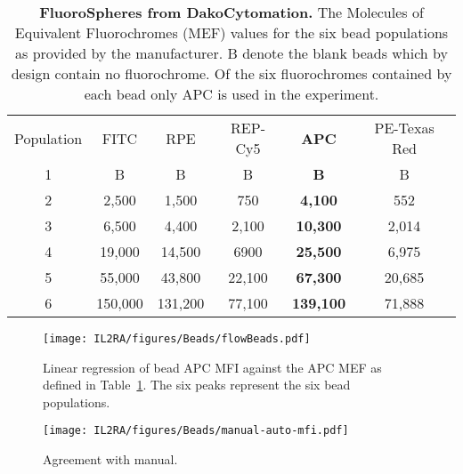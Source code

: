 \clearpage

\begin{table} [hb]
\begin{center}
\begin{tabular} {|c c c c c c|}
\cline{1-6}
Population  & FITC    & RPE     & REP-Cy5 & \textbf{APC}     & PE-Texas Red\\
\cline{1-6}
1           & B       & B       & B       & \textbf{B}       & B \\
2           & 2,500   & 1,500   & 750     & \textbf{4,100}   & 552\\
3           & 6,500   & 4,400   & 2,100   & \textbf{10,300}  & 2,014\\
4           & 19,000  & 14,500  & 6900    & \textbf{25,500}  & 6,975\\
5           & 55,000  & 43,800  & 22,100  & \textbf{67,300}  & 20,685\\
6           & 150,000 & 131,200 & 77,100  & \textbf{139,100} & 71,888\\
\cline{1-6}
\end{tabular}
\end{center}
\caption{
\label{table:fluorospheres}
\textbf{FluoroSpheres from DakoCytomation.}
The Molecules of Equivalent Fluorochromes (MEF) values for the six bead populations as provided by the manufacturer.
B denote the blank beads which by design contain no fluorochrome.
Of the six fluorochromes contained by each bead only APC is used in the experiment.
}
\end{table}

\begin{figure}[hb]
\centering
\texttt{[image: IL2RA/figures/Beads/flowBeads.pdf]}
\caption{
\label{figure:mef}
Linear regression of bead APC MFI against the APC MEF as defined in Table~\ref{table:fluorospheres}.
The six peaks represent the six bead populations.
}
\end{figure}


\begin{figure}[hb]
\centering
\texttt{[image: IL2RA/figures/Beads/manual-auto-mfi.pdf]}
\caption{
\label{figure:bead-agreement}
Agreement with manual.
}
\end{figure}



